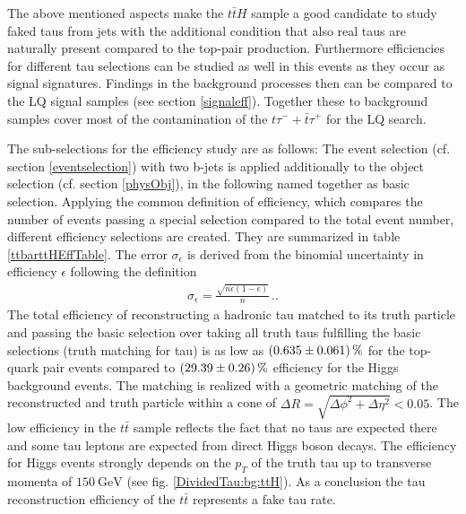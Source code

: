 %
The above mentioned aspects make the $t\bar{t}H$ sample a good candidate to study faked taus from jets with the additional condition that also real taus are naturally present compared to the top-pair production. Furthermore efficiencies for different tau selections can be studied as well in this events as they occur as signal signatures. Findings in the background processes then can be compared to the LQ signal samples (see section \ref{signaleff}). \newline
Together these to background samples cover most of the contamination of the $t\tau^{-}+\bar{t}\tau^{+}$ for the LQ search.\par
The sub-selections for the efficiency study are as follows: The event selection (cf. section \ref{eventselection}) with two b-jets is applied additionally to the object selection (cf. section \ref{physObj}), in the following named together as basic selection. Applying the common definition of efficiency, which compares the number of events passing a special selection compared to the total event number, different efficiency selections are created. They are summarized in table \ref{ttbarttHEffTable}. The error $\sigma_\epsilon$ is derived from the binomial uncertainty in efficiency $\epsilon$ following the definition
\begin{align}
\sigma_\epsilon=\frac{\sqrt{n\epsilon\left(1-\epsilon\right)}}{n}\,\text{.}.
\label{binomialerror}
\end{align}
The total efficiency of reconstructing a hadronic tau matched to its truth particle and passing the basic selection over taking all truth taus fulfilling the basic selections (truth matching for tau) is as low as $\SI{0.635\pm 0.061}{\percent}$ for the top-quark pair events compared to $\SI{29.39\pm 0.26}{\percent}$ efficiency for the Higgs background events. The matching is realized with a geometric matching of the reconstructed and truth particle within a cone of $\Delta R=\sqrt{\Delta\phi^2+\Delta\eta^2}<0.05$. The low efficiency in the $t\bar{t}$ sample reflects the fact that no taus are expected there and some tau leptons are expected from direct Higgs boson decays. The efficiency for Higgs events strongly depends on the $p_T$ of the truth tau up to transverse momenta of $\SI{150}{\giga\electronvolt}$ (see fig. \ref{DividedTau:bg:ttH}). As a conclusion the tau reconstruction efficiency of the $t\bar{t}$ represents a fake tau rate.\par 
%	
